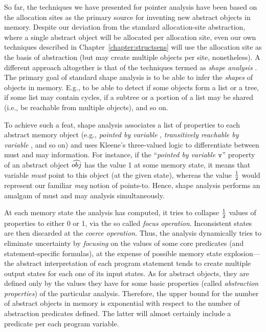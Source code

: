 So far, the techniques we have presented for pointer analysis have
been based on the allocation sites as the primary source for inventing
new abstract objects in memory. Despite our deviation from the
standard allocation-site abstraction, where a single abstract object
will be allocated per allocation site, even our own techniques
described in Chapter~\ref{chapter:structsens} will use the allocation
site as the basis of abstraction (but may create multiple objects per
site, nonetheless). A different approach altogether is that of the
techniques termed as \emph{shape analysis}
\cite{toplas/SagivRW02,popl/SagivRW99,sas/ManevichSRF04,sas/Lev-AmiS00,toplas/SagivRW98,sefm/FerraraFJ12}.
The primary goal of standard shape analysis is to be able to infer the
\emph{shapes} of objects in memory. E.g., to be able to detect if some
objects form a list or a tree, if some list may contain cycles, if a
subtree or a portion of a list may be shared (i.e., be reachable from
multiple objects), and so on.

To achieve such a feat, shape analysis associates a list of properties
to each abstract memory object (e.g., \emph{pointed by variable
  }, \emph{transitively reachable by variable }, and so
on) and uses Kleene's three-valued logic to differentiate between must
and may information. For instance, if the ``\emph{pointed by variable}
\(\texttt{v}\)'' property of an abstract object \(\widehat{obj}\) has the
value 1 at some memory state, it means that variable 
\emph{must} point to this object (at the given state), whereas the
value \(1\over{2}\) would represent our familiar \emph{may} notion of
points-to. Hence, shape analysis performs an amalgam of must and may
analysis simultaneously.

At each memory state the analysis has computed, it tries to collapse
\(1\over{2}\) values of properties to either 0 or 1, via the so called
\emph{focus operation}. Inconsistent states are then discarded at the
\emph{coerce operation}. Thus, the analysis dynamically tries to
eliminate uncertainty by \emph{focusing} on the values of some core
predicates (and statement-specific formulas), at the expense of
possible memory state explosion---the abstract interpretation of each
program statement tends to create multiple output states for each one
of its input states.  As for abstract objects, they are defined only
by the values they have for some basic properties (called
\emph{abstraction properties}) of the particular analysis. Therefore,
the upper bound for the number of abstract objects in memory is
exponential with respect to the number of abstraction predicates
defined. The latter will almost certainly include a predicate per each
program variable.

